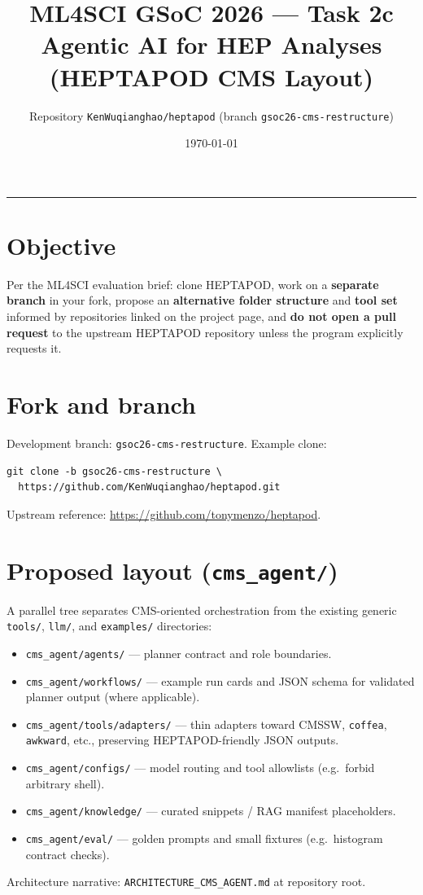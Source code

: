 \documentclass[11pt,a4paper]{article}
\title{ML4SCI GSoC 2026 --- Task 2c\\\large Agentic AI for HEP Analyses (HEPTAPOD CMS Layout)}
\author{Repository \texttt{KenWuqianghao/heptapod} (branch \texttt{gsoc26-cms-restructure})}
\date{\today}
\begin{document}
\maketitle
\tableofcontents
\vspace{1em}
\hrule
\vspace{1em}

\section{Objective}
Per the ML4SCI evaluation brief: clone HEPTAPOD, work on a \textbf{separate branch} in your fork, propose an \textbf{alternative folder structure} and \textbf{tool set} informed by repositories linked on the project page, and \textbf{do not open a pull request} to the upstream HEPTAPOD repository unless the program explicitly requests it.

\section{Fork and branch}
Development branch: \texttt{gsoc26-cms-restructure}. Example clone:
\begin{verbatim}
git clone -b gsoc26-cms-restructure \
  https://github.com/KenWuqianghao/heptapod.git
\end{verbatim}
Upstream reference: \url{https://github.com/tonymenzo/heptapod}.

\section{Proposed layout (\texttt{cms\_agent/})}
A parallel tree separates CMS-oriented orchestration from the existing generic \texttt{tools/}, \texttt{llm/}, and \texttt{examples/} directories:
\begin{itemize}
  \item \texttt{cms\_agent/agents/} --- planner contract and role boundaries.
  \item \texttt{cms\_agent/workflows/} --- example run cards and JSON schema for validated planner output (where applicable).
  \item \texttt{cms\_agent/tools/adapters/} --- thin adapters toward CMSSW, \texttt{coffea}, \texttt{awkward}, etc., preserving HEPTAPOD-friendly JSON outputs.
  \item \texttt{cms\_agent/configs/} --- model routing and tool allowlists (e.g.\ forbid arbitrary shell).
  \item \texttt{cms\_agent/knowledge/} --- curated snippets / RAG manifest placeholders.
  \item \texttt{cms\_agent/eval/} --- golden prompts and small fixtures (e.g.\ histogram contract checks).
\end{itemize}
Architecture narrative: \texttt{ARCHITECTURE\_CMS\_AGENT.md} at repository root.
\end{document}
